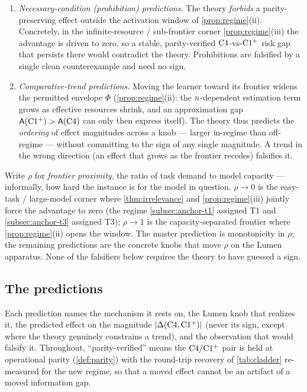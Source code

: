\begin{enumerate}
  \item[(F1)] \emph{Necessary-condition (prohibition) predictions.} The theory
    \emph{forbids} a parity-preserving effect outside the activation window of
    \cref{prop:regime}(ii). Concretely, in the infinite-resource / sub-frontier
    corner \cref{prop:regime}(iii) the advantage is driven to zero, so a stable,
    parity-verified $\mathrm{C}4$-vs-$\mathrm{C1^{+}}$ risk gap that persists there
    would contradict the theory. Prohibitions are falsified by a single clean
    counterexample and need no sign.
  \item[(F2)] \emph{Comparative-trend predictions.} Moving the learner toward
    its frontier widens the permitted envelope $\Phi$ (\cref{prop:regime}(ii):
    the $n$-dependent estimation term grows as effective resources
    shrink, and an approximation gap $\mathsf{A}(\mathrm{C1^{+}})>\mathsf{A}(\mathrm{C}4)$
    can only then express itself). The theory thus predicts the \emph{ordering}
    of effect magnitudes across a knob --- larger in-regime than off-regime ---
    without committing to the sign of any single magnitude. A trend in the wrong
    direction (an effect that grows as the frontier recedes) falsifies it.
\end{enumerate}

Write $\rho$ for \emph{frontier proximity}, the ratio of task demand to model
capacity --- informally, how hard the instance is for the model in question.
$\rho\to 0$ is the easy-task / large-model corner where \cref{thm:irrelevance}
and \cref{prop:regime}(iii) jointly force the advantage to zero (the regime
\cref{subsec:anchor-t1} assigned T1 and \cref{subsec:anchor-t3} assigned T3);
$\rho\to 1$ is the capacity-separated frontier where \cref{prop:regime}(ii)
opens the window. The master prediction is monotonicity in $\rho$; the
remaining predictions are the concrete knobs that move $\rho$ on the Lumen
apparatus. None of the falsifiers below requires the theory to have guessed a
sign.

\subsection{The predictions}
\label{subsec:the-predictions}

Each prediction names the mechanism it rests on, the Lumen knob that realizes
it, the predicted effect on the magnitude $|\Delta(\mathrm{C}4,\mathrm{C1^{+}})|$
(never its sign, except where the theory genuinely constrains a trend), and the
observation that would falsify it. Throughout, ``parity-verified'' means the
$\mathrm{C}4/\mathrm{C1^{+}}$ pair is held at operational parity (\cref{def:parity})
with the round-trip recovery of \cref{tab:cladder} re-measured for the new
regime, so that a moved effect cannot be an artifact of a moved information gap.

